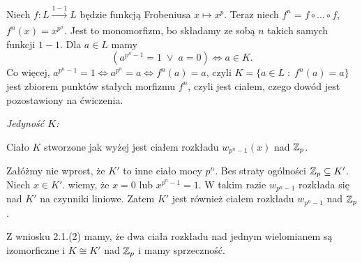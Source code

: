 Niech $f:L\xrightarrow[]{1-1}L$ będzie funkcją Frobeniusa $x\mapsto x^p$. Teraz niech $f^n=f\circ...\circ f$, $f^n(x)=x^{p^n}$. Jest to monomorfizm, bo składamy ze sobą $n$ takich samych funkcji $1-1$. Dla $a\in L$ mamy 
$$(a^{p^n-1}=1\;\lor\;a=0)\iff a\in K.$$
Co więcej, $a^{p^n-1}=1\iff a^{p^n}=a\iff f^n(a)=a$, czyli $K=\{a\in L\;:\;f^n(a)=a\}$ jest zbiorem punktów stałych morfizmu $f^n$, czyli jest ciałem, czego dowód jest pozostawiony na ćwiczenia. 

\emph{Jedyność $K$:}

Ciało $K$ stworzone jak wyżej jest ciałem rozkładu $w_{p^n-1}(x)$ nad $\mathbb{Z}_p$. 

Załóżmy nie wprost, że $K'$ to inne ciało mocy $p^n$. Bes straty ogólności $\mathbb{Z}_p\subseteq K'$. Niech $x\in K'$. wiemy, że $x=0$ lub $x^{p^n-1}=1$. W takim razie $w_{p^n-1}$ rozkłada się nad $K'$ na czynniki liniowe. Zatem $K'$ jest również ciałem rozkładu $w_{p^n-1}$ nad $\mathbb{Z}_p$.

Z wniosku 2.1.(2) mamy, że dwa ciała rozkładu nad jednym wielomianem są izomorficzne i $K\cong K'$ nad $\mathbb{Z}_p$ i mamy sprzeczność.
